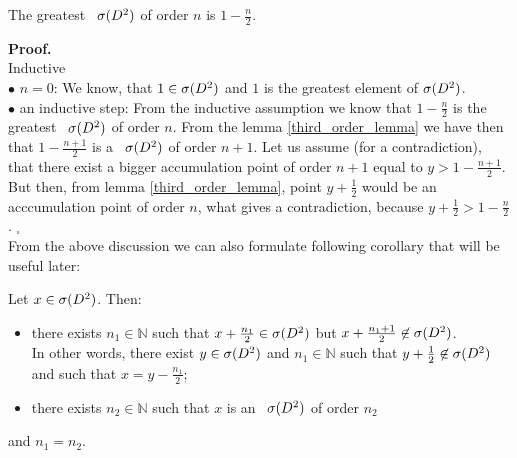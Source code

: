 \begin{theorem}\label{greatest \apots}
The greatest \apots\ ${{\sigma}(D^2)}$ of order $n$ is $1-\frac{n}{2}$.
\end{theorem}
\noindent\textbf{Proof.}\\
Inductive \\
$\bullet$ $n=0$: We know, that $1\in {{\sigma}(D^2)}$ and $1$ is the greatest element of ${{\sigma}(D^2)}$. \\
$\bullet$ an inductive step: From the inductive assumption we know that $1-\frac{n}{2}$ is 
the greatest \apots\ ${{\sigma}(D^2)}$ of order $n$. From the lemma \ref{third_order_lemma} we have then 
that $1-\frac{n+1}{2}$ is a \apots\ ${{\sigma}(D^2)}$ of order $n+1$. Let us assume (for a contradiction), 
that there exist a bigger accumulation point of order $n+1$ equal to $y > 1-\frac{n+1}{2}$. 
But then, from lemma \ref{third_order_lemma}, point $y+\frac{1}{2}$ would be an acccumulation 
point 
of order $n$, what gives a contradiction, because $y+\frac{1}{2}>1-\frac{n}{2}$. $_\square$ 
\\[8pt]
From the above discussion we can also formulate following corollary that will be useful later: 
\begin{corollary}\label{predescors}
Let $x \in {{\sigma}(D^2)}$. Then:
\begin{itemize}
\item there exists $n_1 \in \mathbb{N}$ such that $x + \frac{n_1}{2} \in {{\sigma}(D^2)}$ 
but $x+\frac{n_1+1}{2} \not\in {{\sigma}(D^2)}$. \\ In other words, there exist $y \in {{\sigma}(D^2)}$ and 
$n_1 \in \mathbb{N}$ such that 
$y + \frac{1}{2} \not\in {{\sigma}(D^2)}$ and such that $x = y - \frac{n_1}{2}$;
\item there exists $n_2 \in \mathbb{N}$ such that $x$ is an \apots\ ${{\sigma}(D^2)}$ of 
order $n_2$
\end{itemize}
and $n_1 = n_2$.
\end{corollary}

